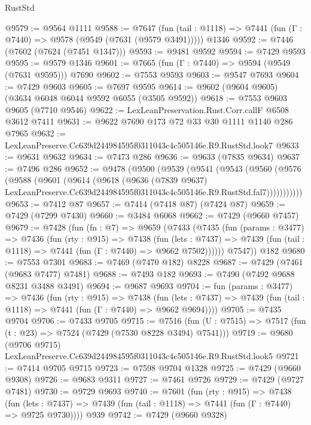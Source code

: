 \begin{lexlean}{RustStd}
\begin{coremodule}
@9579 := @9564 @1111
@9588 := @7647
    (fun (tail : @1118) => @7441 (fun (Γ : @7440) => @9578 (@9549 (@7631 (@9579 @3491)))))
    @1346
@9592 := @7446 (@7602 (@7624 (@7451 @1347)))
@9593 := @9481 @9592
@9594 := @7429 @9593
@9595 := @9579 @1346
@9601 := @7665 (fun (Γ : @7440) => @9594 (@9549 (@7631 @9595))) @7690
@9602 := @7553 @9593
@9603 := @9547 @7693
@9604 := @7429 @9603
@9605 := @7697 @9595
@9614 := @9602 (@9604 @9605) (@3634 @6048 @6044 @9592 @6055 (@3505 @9592))
@9618 := @7553 @9603 @9605 (@7710 @9546)
@9622 := LexLeanPreservation.Rust.Corr.callF @6508 @3612 @7411
@9631 := @9622 @7690 @173 @72 @33 @30 @1111 @1140 @286 @7965
@9632 := LexLeanPreserve.Cc639d244984595f0311043c4c505146e.R9.RustStd.look7
@9633 := @9631 @9632
@9634 := @7473 @286
@9636 := @9633 (@7835 @9634)
@9637 := @7496 @286
@9652 := @9478
    (@9500
      (@9539
        (@9541
          (@9543
            (@9560
              (@9576
                (@9588
                  (@9601
                    (@9614
                      (@9618
                        (@9636
                          (@7839 @9637)
                          LexLeanPreserve.Cc639d244984595f0311043c4c505146e.R9.RustStd.fal7)))))))))))
@9653 := @7412 @87
@9657 := @7414 (@7418 @87) (@7424 @87)
@9659 := @7429 (@7299 @7430)
@9660 := @3484 @6068
@9662 := @7429 (@9660 @7457)
@9679 := @7428
    (fun (fn : @7) =>
    @9659
      (@7433
        (@7435
          (fun (params : @3477) =>
          @7436
            (fun (rty : @915) =>
            @7438
              (fun (lets : @7437) =>
              @7439 (fun (tail : @1118) => @7441 (fun (Γ : @7440) => @9662 @7502))))))
        @7547))
    @182
@9680 := @7553 @7301
@9683 := @7469 (@7470 @182) @8228
@9687 := @7429 (@7461 (@9683 @7477) @7481)
@9688 := @7493 @182
@9693 := @7490 (@7492 @9688 @8231 @3488 @3491)
@9694 := @9687 @9693
@9704 := fun (params : @3477) =>
  @7436
    (fun (rty : @915) =>
    @7438
      (fun (lets : @7437) => @7439 (fun (tail : @1118) => @7441 (fun (Γ : @7440) => @9662 @9694))))
@9705 := @7435 @9704
@9706 := @7433 @9705
@9715 := @7516 (fun (U : @7515) => @7517 (fun (t : @23) => @7524 (@7429 (@7530 @8228 @3494) @7541)))
@9719 := @9680 (@9706 @9715) LexLeanPreserve.Cc639d244984595f0311043c4c505146e.R9.RustStd.look5
@9721 := @7414 @9705 @9715
@9723 := @7598 @9704 @1328
@9725 := @7429 (@9660 @9308)
@9726 := @9683 @9311
@9727 := @7461 @9726
@9729 := @7429 (@9727 @7481)
@9730 := @9729 @9693
@9740 := @7601
    (fun (rty : @915) =>
    @7438
      (fun (lets : @7437) => @7439 (fun (tail : @1118) => @7441 (fun (Γ : @7440) => @9725 @9730))))
    @939
@9742 := @7429 (@9660 @9328)

\end{coremodule}
\end{lexlean}

